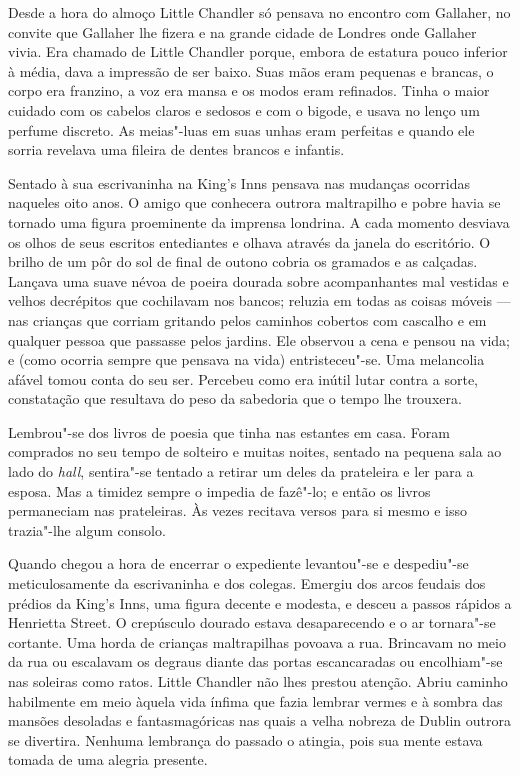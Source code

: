 Desde a hora do almoço Little Chandler só pensava no encontro com Gallaher, no
convite que Gallaher lhe fizera e na grande cidade de Londres onde Gallaher
vivia.  Era chamado de Little Chandler porque, embora de estatura pouco
inferior à média, dava a impressão de ser baixo.  Suas mãos eram pequenas e
brancas, o corpo era franzino, a voz era mansa e os modos eram refinados.
Tinha o maior cuidado com os cabelos claros e sedosos e com o bigode, e usava
no lenço um perfume discreto.  As meias"-luas em suas unhas eram perfeitas e
quando ele sorria revelava uma fileira de dentes brancos e infantis.

Sentado à sua escrivaninha na King’s Inns pensava nas mudanças ocorridas
naqueles oito anos.  O amigo que conhecera outrora maltrapilho e pobre havia se
tornado uma figura proeminente da imprensa londrina.  A cada momento desviava
os olhos de seus escritos entediantes e olhava através da janela do escritório.
O brilho de um pôr do sol de final de outono cobria os gramados e as calçadas.
Lançava uma suave névoa de poeira dourada sobre acompanhantes mal vestidas e
velhos decrépitos que cochilavam nos bancos; reluzia em todas as coisas móveis
--- nas crianças que corriam gritando pelos caminhos cobertos com cascalho e em
qualquer pessoa que passasse pelos jardins.  Ele observou a cena e pensou na
vida; e (como ocorria sempre que pensava na vida) entristeceu"-se.  Uma
melancolia afável tomou conta do seu ser.  Percebeu como era inútil lutar
contra a sorte, constatação que resultava do peso da sabedoria que o tempo lhe
trouxera.

Lembrou"-se dos livros de poesia que tinha nas estantes em casa.  Foram
comprados no seu tempo de solteiro e muitas noites, sentado na pequena sala ao
lado do \textit{hall}, sentira"-se tentado a retirar um deles da prateleira e
ler para a esposa.  Mas a timidez sempre o impedia de fazê"-lo; e então os
livros permaneciam nas prateleiras.  Às vezes recitava versos para si mesmo e
isso trazia"-lhe algum consolo.

Quando chegou a hora de encerrar o expediente levantou"-se e despediu"-se
meticulosamente da escrivaninha e dos colegas.  Emergiu dos arcos feudais dos
prédios da King’s Inns, uma figura decente e modesta, e desceu a passos rápidos
a Henrietta Street.  O crepúsculo dourado estava desaparecendo e o ar
tornara"-se cortante.  Uma horda de crianças maltrapilhas povoava a rua.
Brincavam no meio da rua ou escalavam os degraus diante das portas escancaradas
ou encolhiam"-se nas soleiras como ratos.  Little Chandler não lhes prestou
atenção.  Abriu caminho habilmente em meio àquela vida ínfima que fazia lembrar
vermes e à sombra das mansões desoladas e fantasmagóricas nas quais a velha
nobreza de Dublin outrora se divertira.  Nenhuma lembrança do passado o
atingia, pois sua mente estava tomada de uma alegria presente.

